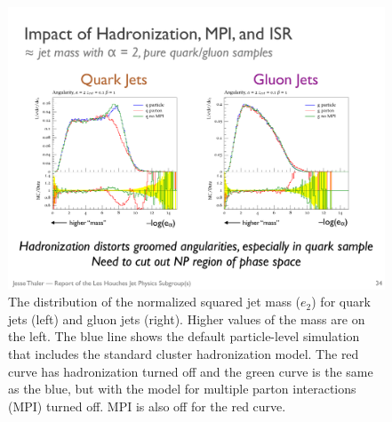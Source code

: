 \begin{figure}[h!]
\begin{center}
\includegraphics[width = 0.99\columnwidth]{figures/robustness.pdf}
\end{center}
\caption{The distribution of the normalized squared jet mass ($e_2$)
  for quark jets (left) and gluon jets (right).  Higher values of the
  mass are on the left.  The blue line shows the default
  particle-level simulation that includes the standard cluster
  hadronization model.  The red curve has hadronization turned off and
  the green curve is the same as the blue, but with the \herwig model
  for multiple parton interactions (MPI) turned off.  MPI is also off
  for the red curve. }
\label{fig:robustness}
\end{figure}

